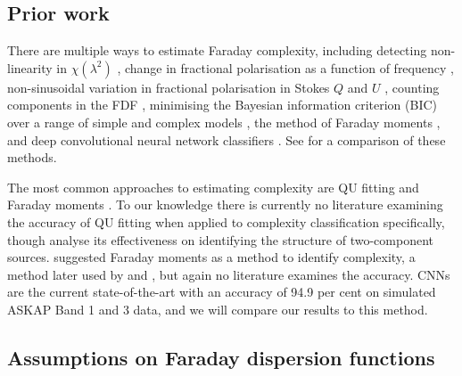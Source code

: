 \documentclass[11pt, a4paper]{book}
\newcommand{\defn}[1]{\emph{#1}}
\begin{document}
  \subsection{Prior work}
  \label{sec:faraday-prior-work}

      There are multiple ways to estimate Faraday complexity, including detecting non-\linebreak{}linearity in $\chi(\lambda^2)$ \citep{goldstein84faraday}, change in fractional polarisation as a function of frequency \citep{farnes14broadband}, non-sinusoidal variation in fractional polarisation in Stokes $Q$ and $U$ \citep{osullivan12agn}, counting components in the FDF \citep{law11faraday}, minimising the Bayesian information criterion (BIC) over a range of simple and complex models \citep[called \defn{QU fitting};][]{osullivan_broad-band_2017}, the method of Faraday moments \citep{anderson_broadband_2015,brown11report}, and deep convolutional neural network classifiers \citep[CNNs;][]{brown_classifying_2018}. See \citet{sun15comparison} for a comparison of these methods.

      The most common approaches to estimating complexity are QU fitting \linebreak\citep[e.g.][]{osullivan_broad-band_2017} and Faraday moments \citep[e.g.][]{anderson_broadband_2015}. To our knowledge there is currently no literature examining the accuracy of QU fitting when applied to complexity classification specifically, though \citet{miyashita19qu} analyse its effectiveness on identifying the structure of two-component sources. \citet{brown11report} suggested Faraday moments as a method to identify complexity, a method later used by \citet{farnes14broadband} and \citet{anderson_broadband_2015}, but again no literature examines the accuracy. CNNs are the current state-of-the-art with an accuracy of 94.9 per cent \citep{brown_classifying_2018} on simulated ASKAP Band 1 and 3 data, and we will compare our results to this method.

  \subsection{Assumptions on Faraday dispersion functions}
  \label{sec:faraday-fdfs}
\end{document}
